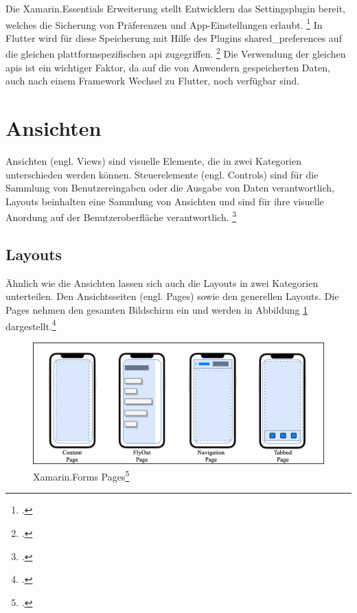 Die Xamarin.Essentials Erweiterung stellt Entwicklern das \glq Settingsplugin\grq{} bereit, welches die Sicherung von Präferenzen und App-Einstellungen erlaubt.  \footcite[Vgl.][Abgerufen am \today]{MicrosoftXamSettings2019} In Flutter wird für diese Speicherung mit Hilfe des Plugins \glq shared\_preferences\grq{}  auf die gleichen plattformspezifischen \ac{api} zugegriffen.  \footcite[Vgl.][Abgerufen am \today]{GoogleFlutterSharedPreferences2020}  Die Verwendung der gleichen \acp{api} ist ein wichtiger Faktor,  da auf die von Anwendern gespeicherten Daten,  auch nach einem Framework Wechsel zu Flutter,  noch verfügbar sind. 

\section{Ansichten}
Ansichten (engl. Views) sind visuelle Elemente, die in zwei Kategorien unterschieden werden können.  Steuerelemente (engl. Controls) sind für die Sammlung von Benutzereingaben oder die Ausgabe von Daten verantwortlich,  Layouts beinhalten eine Sammlung von Ansichten und sind für ihre visuelle Anordung auf der Benutzeroberfläche verantwortlich.  \footcite[Vgl.][Abgerufen am \today]{Ritscher2020}

\subsection{Layouts}
Ähnlich wie die Ansichten lassen sich auch die Layouts in zwei Kategorien unterteilen.  Den Ansichtsseiten (engl. Pages) sowie den generellen Layouts. 
Die Pages nehmen den gesamten Bildschirm ein und werden in Abbildung \ref{fig:Xamarin.Forms Pages} dargestellt.\footcite[Vgl.][Abgerufen am \today]{MicrosoftXamPages2016}  

\begin{figure}[!ht]
 \includegraphics[width=\textwidth,height=\textheight,keepaspectratio]{Images/CrossPlattformFrameworks/XamarinFormsPages.png}
 \caption[Xamarin.Forms Pages]{Xamarin.Forms Pages\footcite{MicrosoftXamPages2016}}
 \label{fig:Xamarin.Forms Pages}
\end{figure}

